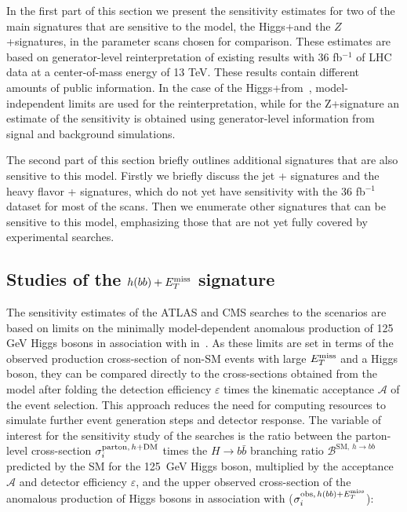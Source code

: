 In the first part of this section we present the sensitivity estimates for two of the main signatures that are sensitive to the model, the Higgs+\MET and the $Z$+\MET signatures, in the parameter scans chosen for comparison. These estimates are based on generator-level reinterpretation of existing results with  36 fb$^{-1}$ of LHC data at a center-of-mass energy of 13 TeV. These results contain different amounts of public information. In the case of the Higgs+\MET from~\cite{Aaboud:2017yqz}, model-independent limits are used for the reinterpretation, while for the Z+\MET signature an estimate of the sensitivity is obtained using generator-level information from signal and background simulations. 

The second part of this section briefly outlines additional signatures that are also sensitive to this model. Firstly we briefly discuss the jet + \MET signatures and the heavy flavor + \MET signatures, which do not yet have sensitivity with the 36 fb$^{-1}$ dataset for most of the scans. Then we enumerate other signatures that can be sensitive to this model, emphasizing those that are not yet fully covered by experimental searches. 


\subsection{Studies of the $h(bb)+E_T^\mathrm{miss}$ signature}
\label{sec:sensi_monohbb}
%

The sensitivity estimates of the ATLAS and CMS \monohbb searches to the \hdma scenarios are based on limits on the minimally model-dependent anomalous production of 125 GeV Higgs bosons in association with \met in~\cite{Aaboud:2017yqz}. 
As these limits are set in terms of the observed production cross-section of non-SM events with large $E_T^\mathrm{miss}$ and a Higgs boson, they can be compared directly to the cross-sections obtained from the \hdma model after folding the detection efficiency $\varepsilon$ times the kinematic acceptance $\mathcal{A}$ of the event selection. This approach reduces the need for computing resources to simulate further event generation steps and detector response. 
The variable of interest for the sensitivity study of the \monohbb searches is the ratio between the parton-level cross-section $\sigma_{i}^{\mathrm{parton},\,h+\textrm{DM}}$ times the $H\rightarrow b\bar{b}$ branching ratio $\mathcal{B}^{\mathrm{SM},\,h\to bb}$ predicted by the SM for the 125~GeV Higgs boson, multiplied by the acceptance $\mathcal{A}$ and detector efficiency $\varepsilon$, and the upper observed cross-section of the anomalous production of Higgs bosons in association with \met ($\sigma_{i}^{\mathrm{obs},\,h(bb)+E_T^\mathrm{miss}}$):

